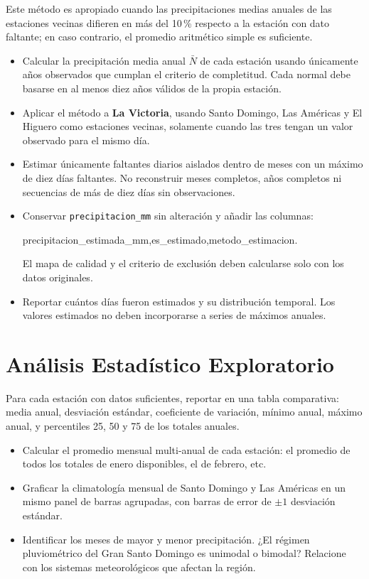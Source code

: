 \documentclass[11pt]{article}
\begin{document}
Este método es apropiado cuando las precipitaciones medias anuales de las estaciones
vecinas difieren en más del 10\,\% respecto a la estación con dato faltante;
en caso contrario, el promedio aritmético simple es suficiente.

\begin{itemize}
  \item Calcular la precipitación media anual $\bar{N}$ de cada estación usando
    únicamente años observados que cumplan el criterio de completitud. Cada normal
    debe basarse en al menos diez años válidos de la propia estación.
  \item Aplicar el método a \textbf{La Victoria}, usando Santo Domingo,
    Las Américas y El Higuero como estaciones vecinas, solamente cuando las tres
    tengan un valor observado para el mismo día.
  \item Estimar únicamente faltantes diarios aislados dentro de meses con un máximo
    de diez días faltantes. No reconstruir meses completos, años completos ni
    secuencias de más de diez días sin observaciones.
  \item Conservar \texttt{precipitacion\_mm} sin alteración y añadir las columnas:
    \begin{center}\small\ttfamily
      precipitacion\_estimada\_mm,\quad es\_estimado,\quad metodo\_estimacion.
    \end{center}
    El mapa de calidad y el criterio de exclusión deben calcularse solo con los
    datos originales.
  \item Reportar cuántos días fueron estimados y su distribución temporal. Los
    valores estimados no deben incorporarse a series de máximos anuales.
\end{itemize}

\section{Análisis Estadístico Exploratorio}


Para cada estación con datos suficientes, reportar en una tabla comparativa:
media anual, desviación estándar, coeficiente de variación, mínimo anual,
máximo anual, y percentiles 25, 50 y 75 de los totales anuales.


\begin{itemize}
  \item Calcular el promedio mensual multi-anual de cada estación: el promedio de
    todos los totales de enero disponibles, el de febrero, etc.
  \item Graficar la climatología mensual de Santo Domingo y Las Américas en un mismo
    panel de barras agrupadas, con barras de error de $\pm 1$ desviación estándar.
  \item Identificar los meses de mayor y menor precipitación.
    ¿El régimen pluviométrico del Gran Santo Domingo es unimodal o bimodal?
    Relacione con los sistemas meteorológicos que afectan la región.
\end{itemize}
\end{document}
